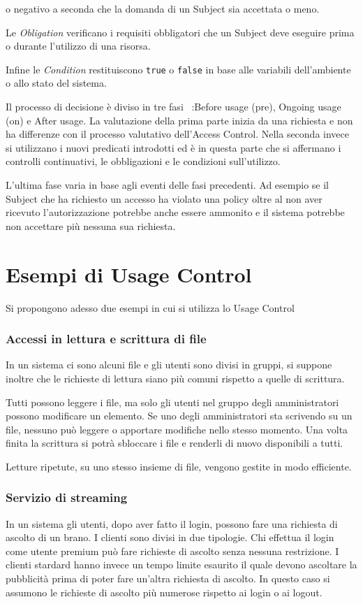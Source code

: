 o negativo a seconda che la domanda di un Subject sia accettata o meno.\par
Le \emph{Obligation} verificano i requisiti obbligatori che un Subject deve eseguire prima o durante l'utilizzo di una risorsa.\par
Infine le \emph{Condition} restituiscono \texttt{true} o \texttt{false} in base alle variabili dell'ambiente o allo stato del sistema.\par
Il processo di decisione è diviso in tre fasi ~\cite{SurveyUsageControl}:Before usage (pre), Ongoing usage (on) e After usage.
La valutazione della prima parte inizia da una richiesta e non ha differenze con il processo valutativo dell'Access Control.
Nella seconda invece si utilizzano i nuovi predicati introdotti ed è in questa parte che si affermano i controlli continuativi,
le obbligazioni e le condizioni sull'utilizzo.\par
L'ultima fase varia in base agli eventi delle fasi precedenti. Ad esempio se il Subject che ha richiesto un accesso ha violato
una policy oltre al non aver ricevuto l'autorizzazione potrebbe anche essere ammonito e il sistema potrebbe non accettare più
nessuna sua richiesta.

\section{Esempi di Usage Control}
\label{subs:es_UC}
Si propongono adesso due esempi in cui si utilizza lo Usage Control
\subsubsection*{Accessi in lettura e scrittura di file}
\label{subs:Accessi in lettura e scrittura di file}
In un sistema ci sono alcuni file e gli utenti sono divisi in gruppi, si suppone inoltre che le richieste di lettura
siano più comuni rispetto a quelle di scrittura.\par Tutti possono leggere i file, ma solo
gli utenti nel gruppo degli amministratori possono modificare un elemento. Se uno degli amministratori sta scrivendo
su un file, nessuno può leggere o apportare modifiche nello stesso momento. Una volta finita la scrittura si potrà sbloccare
i file e renderli di nuovo disponibili a tutti.\par
Letture ripetute, su uno stesso insieme di file, vengono gestite in modo efficiente.
\subsubsection*{Servizio di streaming}
\label{subs:Servizio di streaming}
In un sistema gli utenti, dopo aver fatto il login, possono fare una richiesta di ascolto di un brano. I clienti
sono divisi in due tipologie. Chi effettua il login come utente premium può fare richieste di ascolto senza nessuna restrizione.
I clienti stardard hanno invece un tempo limite esaurito il quale devono ascoltare la pubblicità prima di poter fare
un'altra richiesta di ascolto. In questo caso si assumono le richieste di ascolto più numerose rispetto ai login o ai logout.
